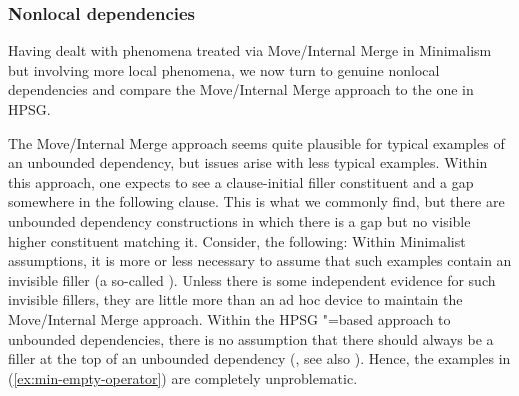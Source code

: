 \documentclass[output=paper
	        ,collection
	        ,collectionchapter
 	        ,biblatex
                ,babelshorthands
                ,newtxmath
                ,draftmode
                ,colorlinks, citecolor=brown
]{langscibook}
\begin{document}
\subsubsection{Nonlocal dependencies}

Having dealt with phenomena treated via Move/Internal Merge in Minimalism but involving more local
phenomena, we now turn to genuine nonlocal dependencies and compare the Move/Internal Merge approach
to the one in HPSG.


The Move/Internal Merge approach seems quite plausible for typical examples of an unbounded
dependency, but issues arise with less typical examples. Within this approach, one expects to see a clause-initial filler constituent and a gap somewhere in the following clause. This is what we commonly
find, but there are unbounded dependency constructions in which there is a gap but no visible higher
constituent matching it. Consider, \eg the following: 
\eal\label{ex:min-empty-operator}
\zl 
Within Minimalist assumptions, it is more or less necessary to assume that such examples contain an
invisible filler (a so-called ). Unless there is some independent evidence for such
invisible fillers, they are little more than an ad hoc device to maintain the Move/Internal Merge
approach. Within the HPSG \slasch"=based approach to unbounded dependencies, there is no assumption
that there should always be a filler at the top of an unbounded dependency (\citealp[Chapter~4]{ps2}, see also ). Hence, the examples in
(\ref{ex:min-empty-operator}) are completely unproblematic. 

\end{document}
